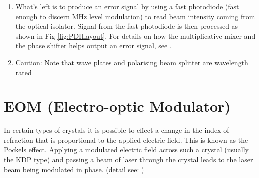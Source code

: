 \documentclass[12pt]{report}
\begin{document}
\begin{enumerate}
    \item What's left is to produce an error signal by using a fast photodiode (fast enough to discern MHz level modulation) to read beam intensity coming from the optical isolator. Signal from the fast photodiode is then processed as shown in Fig \ref{fig:PDHlayout}. For details on how the multiplicative mixer and the phase shifter helps output an error signal, see \cite{PDHintro}.

    \item Caution: Note that wave plates and polarising beam splitter are wavelength rated
\end{enumerate}

\section{EOM (Electro-optic Modulator)}
In certain types of crystals it is possible to effect a change in the index of refraction that is proportional to the applied electric field. This is known as the Pockels effect. Applying a modulated electric field across such a crystal (usually the KDP type) and passing a beam of laser through the crystal leads to the laser beam being modulated in phase. (detail see: \cite{fundamentalsOfPhotonics}) 
\end{document}
